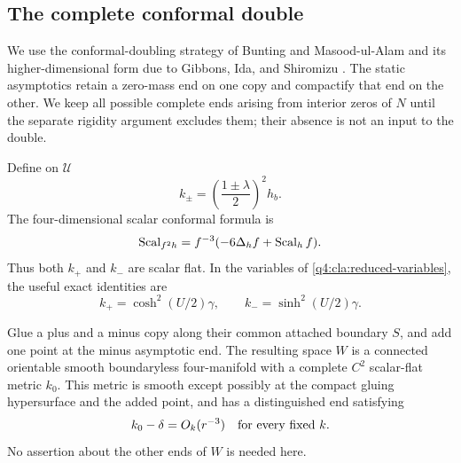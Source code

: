 \subsection{The complete conformal double}

We use the conformal-doubling strategy of Bunting and Masood-ul-Alam
\cite{BuntingMasoodUlAlam1987} and its higher-dimensional form due
to Gibbons, Ida, and Shiromizu
\cite[Section~2]{GibbonsIdaShiromizu2002}. The static asymptotics
retain a zero-mass end on one copy and compactify that end on the
other. We keep all possible complete ends arising from interior
zeros of $N$ until the separate rigidity argument excludes them;
their absence is not an input to the double.

Define on $\mathcal U$
\begin{equation}\label{q4:cla:conformal-metrics}
 k_\pm=\left(\frac{1\pm\lambda}{2}\right)^2h_b.
\end{equation}
The four-dimensional scalar conformal formula is
\begin{equation}\label{q4:cla:scalar-transform}
 \operatorname{Scal}_{f^2h}=f^{-3}(-6\Delta_h f+\operatorname{Scal}_h f).
\end{equation}
Thus both $k_+$ and $k_-$ are scalar flat.  In the variables of
\eqref{q4:cla:reduced-variables}, the useful exact identities are
\begin{equation}\label{q4:cla:hyperbolic-factors}
 k_+=\cosh^2(U/2)\gamma,
 \qquad k_-=\sinh^2(U/2)\gamma.
\end{equation}

\begin{lemma}\label{q4:cla:double}
Glue a plus and a minus copy along their common attached boundary $S$,
and add one point at the minus asymptotic end.
The resulting space $W$ is a connected orientable smooth
boundaryless four-manifold with a complete $C^2$ scalar-flat metric
$k_0$.  This metric is smooth except possibly at the compact gluing
hypersurface and the added point, and has a distinguished
end satisfying
\begin{equation}\label{q4:cla:zero-end}
 k_0-\delta=O_k(r^{-3})
 \quad\hbox{for every fixed }k.
\end{equation}
No assertion about the other ends of $W$ is needed here.
\end{lemma}

